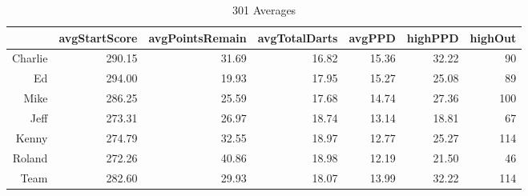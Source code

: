 \documentclass{article}\usepackage[]{graphicx}\usepackage[]{color}
\begin{document}
\begin{table}[ht]
\begin{center}
\caption{301 Averages}
\begin{tabular}{rrrrrrr}
  \hline
 & avgStartScore & avgPointsRemain & avgTotalDarts & avgPPD & highPPD & highOut \\ 
  \hline
Charlie & 290.15 & 31.69 & 16.82 & 15.36 & 32.22 &  90 \\ 
  Ed & 294.00 & 19.93 & 17.95 & 15.27 & 25.08 &  89 \\ 
  Mike & 286.25 & 25.59 & 17.68 & 14.74 & 27.36 & 100 \\ 
  Jeff & 273.31 & 26.97 & 18.74 & 13.14 & 18.81 &  67 \\ 
  Kenny & 274.79 & 32.55 & 18.97 & 12.77 & 25.27 & 114 \\ 
  Roland & 272.26 & 40.86 & 18.98 & 12.19 & 21.50 &  46 \\ 
  Team & 282.60 & 29.93 & 18.07 & 13.99 & 32.22 & 114 \\ 
   \hline
\end{tabular}
\end{center}
\end{table}
\end{document}
